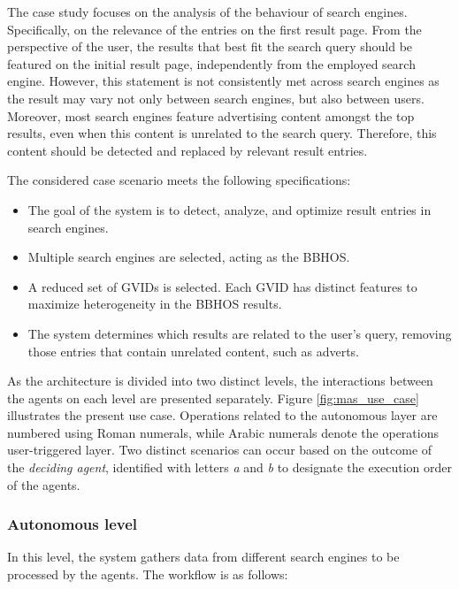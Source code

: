 The case study focuses on the analysis of the behaviour of search engines. Specifically, on the relevance of the entries on the first result page. From the perspective of the user, the results that best fit the search query should be featured on the initial result page, independently from the employed search engine. However, this statement is not consistently met across search engines as the result may vary not only between search engines, but also between users. Moreover, most search engines feature advertising content amongst the top results, even when this content is unrelated to the search query. Therefore, this content should be detected and replaced by relevant result entries.

The considered case scenario meets the following specifications:
\begin{itemize}
    \item The goal of the system is to detect, analyze, and optimize result entries in search engines.
    \item Multiple search engines are selected, acting as the BBHOS.
    \item A reduced set of GVIDs is selected. Each GVID has distinct features to maximize heterogeneity in the BBHOS results.
    \item The system determines which results are related to the user's query, removing those entries that contain unrelated content, such as adverts.
\end{itemize}

As the architecture is divided into two distinct levels, the interactions between the agents on each level are presented separately. Figure \ref{fig:mas_use_case} illustrates the present use case. Operations related to the autonomous layer are numbered using Roman numerals, while Arabic numerals denote the operations user-triggered layer. Two distinct scenarios can occur based on the outcome of the \textit{deciding agent}, identified with letters \textit{a} and \textit{b} to designate the execution order of the agents.

\subsubsection*{Autonomous level}
In this level, the system gathers data from different search engines to be processed by the agents. The workflow is as follows:

